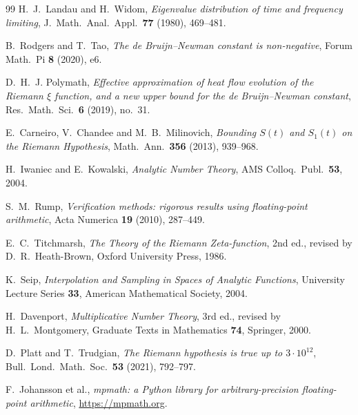 ﻿\documentclass[11pt]{article}
\begin{document}
\begin{thebibliography}{99}
H.~J.~Landau and H.~Widom,
\emph{Eigenvalue distribution of time and frequency limiting},
J.\ Math.\ Anal.\ Appl.\ \textbf{77} (1980), 469--481.

B.~Rodgers and T.~Tao,
\emph{The de Bruijn--Newman constant is non-negative},
Forum Math.\ Pi \textbf{8} (2020), e6.

D.~H.~J. Polymath,
\emph{Effective approximation of heat flow evolution of the Riemann
$\xi$ function, and a new upper bound for the de Bruijn--Newman
constant},
Res.\ Math.\ Sci.\ \textbf{6} (2019), no.~31.

E.~Carneiro, V.~Chandee and M.~B.~Milinovich,
\emph{Bounding $S(t)$ and $S_1(t)$ on the Riemann Hypothesis},
Math.\ Ann.\ \textbf{356} (2013), 939--968.

H.~Iwaniec and E.~Kowalski,
\emph{Analytic Number Theory},
AMS Colloq.\ Publ.\ \textbf{53}, 2004.

S.~M.~Rump,
\emph{Verification methods: rigorous results using floating-point
arithmetic},
Acta Numerica \textbf{19} (2010), 287--449.

E.~C.~Titchmarsh,
\emph{The Theory of the Riemann Zeta-function},
2nd ed., revised by D.~R.~Heath-Brown, Oxford University Press, 1986.

K.~Seip,
\emph{Interpolation and Sampling in Spaces of Analytic Functions},
University Lecture Series \textbf{33}, American Mathematical Society,
2004.

H.~Davenport,
\emph{Multiplicative Number Theory},
3rd ed., revised by H.~L.~Montgomery, Graduate Texts in Mathematics
\textbf{74}, Springer, 2000.

D.~Platt and T.~Trudgian,
\emph{The Riemann hypothesis is true up to $3\cdot10^{12}$},
Bull.\ Lond.\ Math.\ Soc.\ \textbf{53} (2021), 792--797.

F.~Johansson et al.,
\emph{mpmath: a Python library for arbitrary-precision floating-point
arithmetic}, \url{https://mpmath.org}.

\end{thebibliography}
\end{document}

